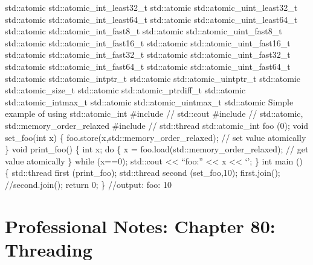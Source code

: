 std::atomic std::atomic\_int\_least32\_t std::atomic
std::atomic\_uint\_least32\_t std::atomic std::atomic\_int\_least64\_t
std::atomic std::atomic\_uint\_least64\_t std::atomic
std::atomic\_int\_fast8\_t std::atomic std::atomic\_uint\_fast8\_t
std::atomic std::atomic\_int\_fast16\_t std::atomic
std::atomic\_uint\_fast16\_t std::atomic std::atomic\_int\_fast32\_t
std::atomic std::atomic\_uint\_fast32\_t std::atomic
std::atomic\_int\_fast64\_t std::atomic std::atomic\_uint\_fast64\_t
std::atomic std::atomic\_intptr\_t std::atomic std::atomic\_uintptr\_t
std::atomic std::atomic\_size\_t std::atomic std::atomic\_ptrdiff\_t
std::atomic std::atomic\_intmax\_t std::atomic std::atomic\_uintmax\_t
std::atomic Simple example of using std::atomic\_int \#include //
std::cout \#include // std::atomic, std::memory\_order\_relaxed
\#include // std::thread std::atomic\_int foo (0); void set\_foo(int x)
\{ foo.store(x,std::memory\_order\_relaxed); // set value atomically \}
void print\_foo() \{ int x; do \{ x =
foo.load(std::memory\_order\_relaxed); // get value atomically \} while
(x==0); std::cout \textless\textless{} ``foo:'' \textless\textless{} x
\textless\textless{} `\n'; \} int main () \{ std::thread first
(print\_foo); std::thread second (set\_foo,10); first.join();
//second.join(); return 0; \} //output: foo: 10

\hypertarget{professional-notes-chapter-80-threading-1}{%
\chapter{Professional Notes: Chapter 80:
Threading}\label{professional-notes-chapter-80-threading-1}}

